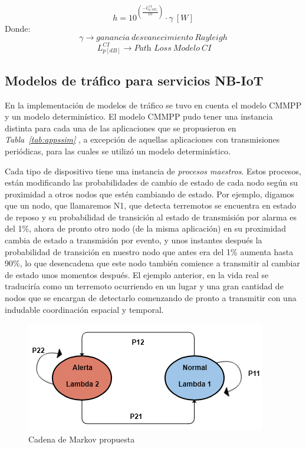 \begin{equation}
    h =  10^{(\frac{-L_{p [dB]}^{CI}}{10})} \cdot \gamma\ [W]
    \label{eqn:h_canal}
\end{equation}
Donde:
\[\gamma \to ganancia\ desvanecimiento\ Rayleigh\]
\[\ L_{p [dB]}^{CI} \to \textit{Path\ Loss}\ Modelo\ CI \]

\subsection{Modelos de tráfico para servicios NB-IoT}

En la implementación de modelos de tráfico se tuvo en cuenta el modelo CMMPP y un modelo determinístico. El modelo CMMPP pudo tener una instancia distinta para cada una de las aplicaciones que se propusieron en \textit{Tabla~\ref{tab:appssim} }, a excepción de aquellas aplicaciones con transmisiones periódicas, para las cuales se utilizó un modelo determinístico\textit{.}\newline

Cada tipo de dispositivo tiene una instancia de \textit{procesos maestros}. Estos procesos, están modificando las probabilidades de cambio de estado de cada nodo según su proximidad a otros nodos que estén cambiando de estado. Por ejemplo, digamos que un nodo, que llamaremos N1, que detecta terremotos se encuentra en estado de reposo y su probabilidad de transición al estado de transmisión por alarma es del 1\%, ahora de pronto otro nodo (de la misma aplicación) en su proximidad cambia de estado a transmisión por evento, y unos instantes después la probabilidad de transición en nuestro nodo que antes era del 1\% aumenta hasta 90\%, lo que desencadena que este nodo también comience a transmitir al cambiar de estado unos momentos después. El ejemplo anterior, en la vida real se traduciría como un terremoto ocurriendo en un lugar y una gran cantidad de nodos que se encargan de detectarlo comenzando de pronto a transmitir con una indudable coordinación espacial y temporal.\newline

\begin{figure}[th]
\centering
\includegraphics[scale=1]{Figures/Cadena de Markov propuesta}
\decoRule
\caption[Cadena de Markov propuesta]{Cadena de Markov propuesta}
\label{fig:CMMPPpropuesta}
\end{figure}

